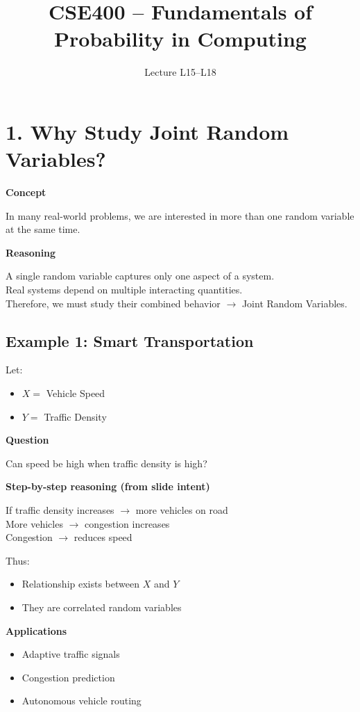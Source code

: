 \documentclass[12pt]{article}
\title{CSE400 -- Fundamentals of Probability in Computing}
\author{Lecture L15--L18}
\date{}
\begin{document}
\maketitle

\section*{1. Why Study Joint Random Variables?}

\textbf{Concept}

In many real-world problems, we are interested in more than one random variable at the same time.

\textbf{Reasoning}

A single random variable captures only one aspect of a system. \\
Real systems depend on multiple interacting quantities. \\
Therefore, we must study their combined behavior $\rightarrow$ Joint Random Variables.

\subsection*{Example 1: Smart Transportation}

Let:
\begin{itemize}
\item $X =$ Vehicle Speed
\item $Y =$ Traffic Density
\end{itemize}

\textbf{Question}

Can speed be high when traffic density is high?

\textbf{Step-by-step reasoning (from slide intent)}

If traffic density increases $\rightarrow$ more vehicles on road \\
More vehicles $\rightarrow$ congestion increases \\
Congestion $\rightarrow$ reduces speed

Thus:
\begin{itemize}
\item Relationship exists between $X$ and $Y$
\item They are correlated random variables
\end{itemize}

\textbf{Applications}
\begin{itemize}
\item Adaptive traffic signals
\item Congestion prediction
\item Autonomous vehicle routing
\end{itemize}
\end{document}
